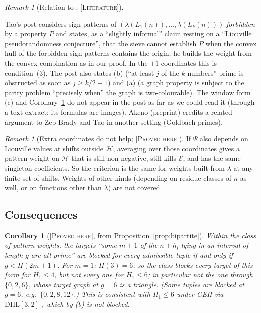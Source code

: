 \documentclass[11pt]{amsart}
\newtheorem{corollary}[theorem]{Corollary}
\theoremstyle{definition}
\theoremstyle{remark}
\newtheorem{remark}[theorem]{Remark}
\newcommand{\lbl}[1]{\textup{\textsc{[#1]}}}
\begin{document}
\begin{remark}[Relation to \cite{Tao14b}; \lbl{Literature}]\label{rem:tao14b}
\begin{sloppypar}
Tao's post considers sign patterns of $(\lambda(L_1(n)),\dots,\lambda(L_k(n)))$
\emph{forbidden} by a property $P$ and states, as a ``slightly informal''
claim resting on a ``Liouville pseudorandomness conjecture'', that the sieve
cannot establish $P$ when the convex hull of the forbidden sign patterns
contains the origin; he builds the weight from the convex combination as in
our proof. In the $\pm1$ coordinates this is condition~(3). The post also
states (b) (``at least $j$ of the $k$ numbers'' prime is obstructed as soon as
$j\ge k/2+1$) and (a) (a graph property is subject to the parity problem
``precisely when'' the graph is two-colourable). The window form (c) and
Corollary~\ref{cor:six} do not appear in the post as far as we could read it
(through a text extract; its formulas are images). Akeno
\cite[\S5, footnote~3]{Ake25} (preprint) credits a related argument to Zeb Brady and Tao
in another setting (Goldbach primes).
\end{sloppypar}
\end{remark}

\begin{remark}[Extra coordinates do not help; \lbl{Proved here}]\label{rem:marg}
If $\Psi$ also depends on Liouville values at shifts outside $\mathcal H$,
averaging over those coordinates gives a pattern weight on $\mathcal H$ that
is still non-negative, still kills $\mathcal E$, and has the same singleton
coefficients. So the criterion is the same for weights built from $\lambda$
at any finite set of shifts. Weights of other kinds (depending on residue
classes of $n$ as well, or on functions other than $\lambda$) are not covered.
\end{remark}

\subsection{Consequences}
\begin{corollary}[\lbl{Proved here}, from Proposition~\ref{prop:bipartite}]\label{cor:six}
Within the class of pattern weights, the targets ``some $m+1$ of the $n+h_i$
lying in an interval of length $g$ are all prime'' are blocked for every
admissible tuple if and only if $g<H(2m+1)$. For $m=1$: $H(3)=6$, so the class
blocks every target of this form for $H_1\le4$, but not every one for $H_1\le 6$; in
particular not the one through $\{0,2,6\}$, whose target graph at $g=6$ is a
triangle. (Some tuples are blocked at $g=6$, e.g.\ $\{0,2,8,12\}$.) This is
consistent with $H_1\le6$ under GEH via $\mathrm{DHL}[3,2]$
\cite[Theorem~1.4(xii)]{PM8b}, which by (b) is not blocked.
\end{corollary}
\end{document}
